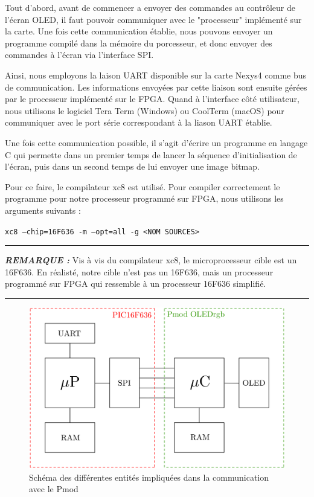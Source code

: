 \documentclass[11pt]{article}
\newcommand{\HRule}{\rule{\linewidth}{0.5mm}}
\newenvironment{rmq}[1] {\noindent\HRule\par\vspace{5pt}\textbf{\textit{REMARQUE : }}#1}{\\\HRule\par\vspace{5pt}}
\begin{document}
Tout d'abord, avant de commencer a envoyer des commandes au contrôleur de l'écran OLED, il faut pouvoir communiquer avec le "processeur" implémenté sur la carte. Une fois cette communication établie, nous pouvons envoyer un programme compilé dans la mémoire du porcesseur, et donc envoyer des commandes à l'écran via l'interface SPI. 

Ainsi, nous employons la laison UART disponible sur la carte Nexys4 comme bus de communication. Les informations envoyées par cette liaison sont ensuite gérées par le processeur implémenté sur le FPGA. Quand à l'interface côté utilisateur, nous utilisons le logiciel Tera Term (Windows) ou CoolTerm (macOS) pour communiquer avec le port série correspondant à la liason UART établie. 

Une fois cette communication possible, il s'agit d'écrire un programme en langage C qui permette dans un premier temps de lancer la séquence d'initialisation de l'écran, puis dans un second temps de lui envoyer une image bitmap. 

Pour ce faire, le compilateur xc8 est utilisé. Pour compiler correctement le programme pour notre processeur programmé sur FPGA, nous utilisons les arguments suivants : 
\begin{center}
    \texttt{xc8 --chip=16F636 -m --opt=all -g <NOM SOURCES>}
\end{center}

\begin{rmq}
    Vis à vis du compilateur xc8, le microprocesseur cible est un 16F636. En réalisté, notre cible n'est pas un 16F636, mais un processeur programmé sur FPGA qui ressemble à un processeur 16F636 simplifié. 
\end{rmq}

\begin{figure}[H]
\begin{center}
\includegraphics[scale =0.18, keepaspectratio]{soft}
\caption{Schéma des différentes entités impliquées dans la communication avec le Pmod}
\end{center}
\end{figure}
\end{document}
